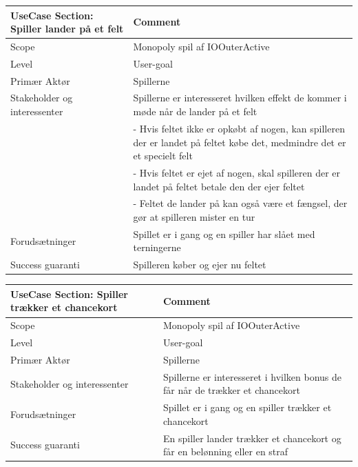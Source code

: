 \begin{center}
\begin{tabular}{ | m{10em} | m{10cm}| }
        \hline
            UseCase Section: Spiller lander på et felt & Comment\\
        \hline
            Scope & Monopoly spil af IOOuterActive\\
        \hline
            Level & User-goal\\
        \hline
            Primær Aktør & Spillerne\\
        \hline
            Stakeholder og interessenter & Spillerne er interesseret hvilken effekt de kommer i møde når de lander på et felt\\
            & - Hvis feltet ikke er opkøbt af nogen, kan spilleren der er landet på feltet købe det, medmindre det er et specielt felt\\
            & - Hvis feltet er ejet af nogen, skal spilleren der er landet på feltet betale den der ejer feltet\\
            & - Feltet de lander på kan også være et fængsel, der gør at spilleren mister en tur\\
        \hline
            Forudsætninger & Spillet er i gang og en spiller har slået med terningerne\\
        \hline
            Success guaranti & Spilleren køber og ejer nu feltet\\
        \hline
    \end{tabular}
\end{center}

\begin{center}
\begin{tabular}{ | m{10em} | m{10cm}| }
        \hline
            UseCase Section: Spiller trækker et chancekort & Comment\\
        \hline
            Scope & Monopoly spil af IOOuterActive\\
        \hline
            Level & User-goal\\
        \hline
            Primær Aktør & Spillerne\\
        \hline
            Stakeholder og interessenter & Spillerne er interesseret i hvilken bonus de får når de trækker et chancekort\\
        \hline
            Forudsætninger & Spillet er i gang og en spiller trækker et chancekort\\
        \hline
            Success guaranti & En spiller lander trækker et chancekort og får en belønning eller en straf\\
        \hline
    \end{tabular}
\end{center}

